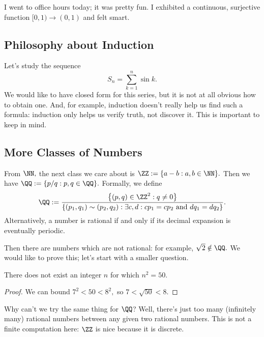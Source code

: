








I went to office hours today; it was pretty fun. I exhibited a continuous, surjective function $[0,1)\to(0,1)$ and felt smart.

\subsection{Philosophy about Induction}
Let's study the sequence
\[S_n=\sum_{k=1}^n\sin k.\]
We would like to have closed form for this series, but it is not at all obvious how to obtain one. And, for example, induction doesn't really help us find such a formula: induction only helps us verify truth, not discover it. This is important to keep in mind.

\subsection{More Classes of Numbers}
From $\NN,$ the next class we care about is $\ZZ:=\{a-b:a,b\in\NN\}.$ Then we have $\QQ:=\{p/q:p,q\in\QQ\}.$ Formally, we define
\[\QQ:=\frac{\left\{(p,q)\in\ZZ^2:q\ne0\right\}}{\{(p_1,q_1)\sim(p_2,q_2):\exists c,d:cp_1=cp_2\text{ and }dq_1=dq_2\}}.\]
Alternatively, a number is rational if and only if its decimal expansion is eventually periodic.

Then there are numbers which are not rational: for example, $\sqrt2\notin\QQ.$ We would like to prove this; let's start with a smaller question.
\begin{prop}
    There does not exist an integer $n$ for which $n^2=50.$
\end{prop}
\begin{proof}
    We can bound $7^2<50<8^2,$ so $7<\sqrt{50}<8.$
\end{proof}
Why can't we try the same thing for $\QQ$? Well, there's just too many (infinitely many) rational numbers between any given two rational numbers. This is not a finite computation here: $\ZZ$ is nice because it is discrete.

